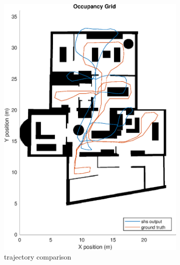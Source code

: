 \begin{figure}[H]
	\centering
	\begin{subfigure}[t]{.45\textwidth}
		\centering
		\includegraphics[width=0.9\linewidth]{images/20201029_1042_trial2_shs_1}
		\caption{trajectory comparison}
		\label{fig:trial2_on_map}
	\end{subfigure}
	\begin{subfigure}[t]{.45\textwidth}
		\centering

\end{subfigure}
\end{figure}
